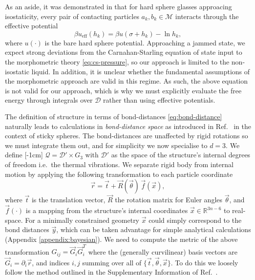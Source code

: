 \documentclass[11pt,twoside]{report}
\begin{document}
As an aside, it was demonstrated in \cite{BritoEEL2006} that for hard sphere glasses approacing isostaticity, every pair of contacting particles $a_k,b_k \in \mathcal{M}$ interacts through the effective potential
\begin{equation*}
  \beta u_\mathrm{eff}(h_k) = \beta u(\sigma + h_k) - \ln{h_k},
\end{equation*}
where $u(\cdot)$ is the bare hard sphere potential.
Approaching a jammed state, we expect strong deviations from the Carnahan-Starling equation of state input to the morphometric theory \eqref{eq:cs-pressure}, so our approach is limited to the non-isostatic liquid.
In addition, it is unclear whether the fundamental assumptions of the morphometric approach are valid in this regime.
As such, the above equation is not valid for our approach, which is why we must explicitly evaluate the free energy through integrals over $\mathcal{D}$ rather than using effective potentials.

The definition of structure in terms of bond-distances \eqref{eq:bond-distance} naturally leads to calculations in \emph{bond-distance space} as introduced in Ref.\ \cite{Holmes-CerfonPNAS2013} in the context of sticky spheres.
The bond-distances are unaffected by rigid rotations so we must integrate them out, and for simplicity we now specialise to $d=3$.
We define%
[-1cm]
$\mathcal{Q} = \mathcal{D}' \times G_3$ with $\mathcal{D}'$ as the space of the structure's internal degrees of freedom i.e.\ the thermal vibrations.
We separate rigid body from internal motion by applying the following transformation to each particle coordinate
\begin{equation*}
  \vec{r}
  =
  \vec{t} + \vec{R}(\vec{\theta}) \, \vec{f}(\vec{x}),
\end{equation*}
where $\vec{t}$ is the translation vector, $\vec{R}$ the rotation matrix for Euler angles $\vec{\theta}$, and $\vec{f}(\cdot)$ is a mapping from the structure's internal coordinates $\vec{x} \in \mathbb{R}^{3n-6}$ to real-space.
For a minimally constrained geometry $\vec{x}$ could simply correspond to the bond distances $\vec{y}$, which can be taken advantage for simple analytical calculations (Appendix \ref{appendix:bayesian}).
We need to compute the metric of the above transformation $G_{ij} = \vec{G}_i \vec{G}_i^T$ where the (generally curvilinear) basis vectors are $\vec{G}_i = \partial_i \vec{r}$, and indices $i,j$ summing over all of $\{\vec{t}, \vec{\theta}, \vec{x}\}$.
To do this we loosely follow the method outlined in the Supplementary Information of Ref.\ \cite{Holmes-CerfonPNAS2013}.
\end{document}

